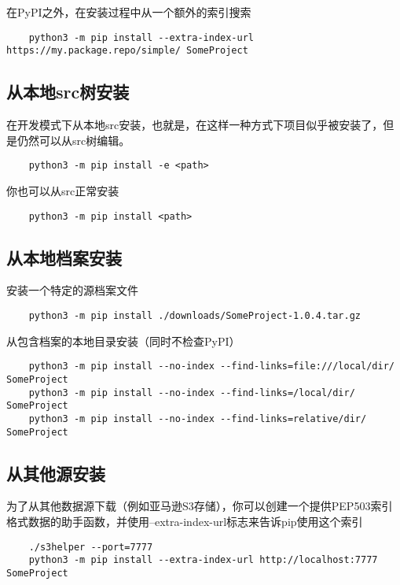\documentclass[../package_tutorial.tex]{subfiles}
\begin{document}
在PyPI之外，在安装过程中从一个额外的索引搜索

\begin{lstlisting}
    python3 -m pip install --extra-index-url https://my.package.repo/simple/ SomeProject
\end{lstlisting}

\subsection{从本地src树安装}

在开发模式下从本地src安装，也就是，在这样一种方式下项目似乎被安装了，但是仍然可以从src树编辑。

\begin{lstlisting}
    python3 -m pip install -e <path>
\end{lstlisting}

你也可以从src正常安装

\begin{lstlisting}
    python3 -m pip install <path>
\end{lstlisting}

\subsection{从本地档案安装}

安装一个特定的源档案文件

\begin{lstlisting}
    python3 -m pip install ./downloads/SomeProject-1.0.4.tar.gz
\end{lstlisting}

从包含档案的本地目录安装（同时不检查PyPI）

\begin{lstlisting}
    python3 -m pip install --no-index --find-links=file:///local/dir/ SomeProject
    python3 -m pip install --no-index --find-links=/local/dir/ SomeProject
    python3 -m pip install --no-index --find-links=relative/dir/ SomeProject
\end{lstlisting}

\subsection{从其他源安装}

为了从其他数据源下载（例如亚马逊S3存储），你可以创建一个提供PEP503索引格式数据的助手函数，并使用--extra-index-url标志来告诉pip使用这个索引

\begin{lstlisting}
    ./s3helper --port=7777
    python3 -m pip install --extra-index-url http://localhost:7777 SomeProject
\end{lstlisting}
\end{document}
